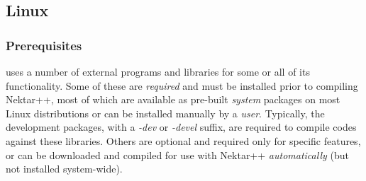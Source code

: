 \subsection{Linux}
\subsubsection{Prerequisites}
\nekpp uses a number of external programs and libraries for some or all of its
functionality. Some of these are \emph{required} and must be installed prior to
compiling Nektar++, most of which are available as pre-built \emph{system}
packages on most Linux distributions or can be installed manually by a
\emph{user}. Typically, the development packages, with a \emph{-dev} or \emph{-devel} suffix, are required to compile codes against these libraries. Others are optional and required only for specific features, or can
be downloaded and compiled for use with Nektar++ \emph{automatically} (but not
installed system-wide).

